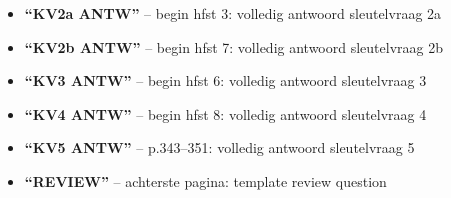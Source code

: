 \documentclass[a4paper,10pt]{article}
\begin{document}
\begin{infobox}
\begin{itemize}[noitemsep]
  \item \textbf{``KV2a ANTW''} -- begin hfst 3: volledig antwoord sleutelvraag 2a
  \item \textbf{``KV2b ANTW''} -- begin hfst 7: volledig antwoord sleutelvraag 2b
  \item \textbf{``KV3 ANTW''} -- begin hfst 6: volledig antwoord sleutelvraag 3
  \item \textbf{``KV4 ANTW''} -- begin hfst 8: volledig antwoord sleutelvraag 4
  \item \textbf{``KV5 ANTW''} -- p.343--351: volledig antwoord sleutelvraag 5
  \item \textbf{``REVIEW''} -- achterste pagina: template review question
\end{itemize}
\end{infobox}
\end{document}
